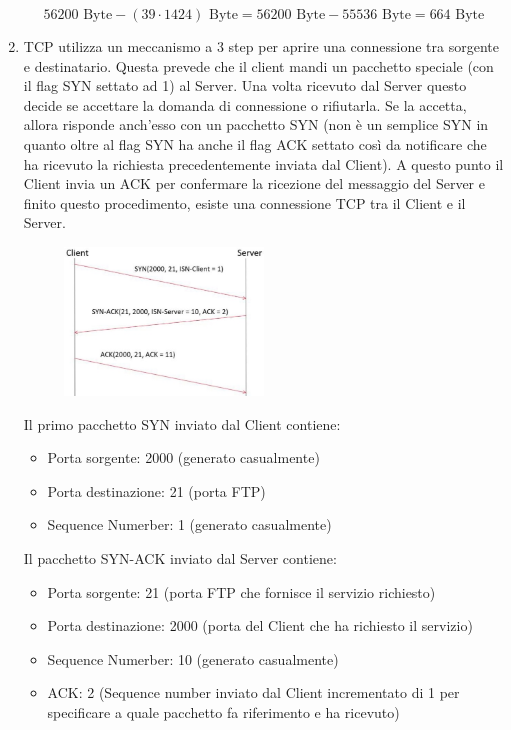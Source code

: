 \documentclass[10pt,a4paper]{article}
\begin{document}
\begin{enumerate}
		$$56200 \textrm{ Byte} - (39 \cdot 1424) \textrm{ Byte} = 56200 \textrm{ Byte} - 55536 \textrm{ Byte} = 664 \textrm{ Byte}$$
		\item TCP utilizza un meccanismo a 3 step per aprire una connessione tra sorgente e destinatario. Questa prevede che il client mandi un pacchetto speciale (con il flag SYN settato ad 1) al Server. Una volta ricevuto dal Server questo decide se accettare la domanda di connessione o rifiutarla. 
		Se la accetta, allora risponde anch'esso con un pacchetto SYN (non è un semplice SYN in quanto oltre al flag SYN ha anche il flag ACK settato così da notificare che ha ricevuto la richiesta precedentemente inviata dal Client). A questo punto il Client invia un ACK per confermare la ricezione 
		del messaggio del Server e finito questo procedimento, esiste una connessione TCP tra il Client e il Server.
		\begin{figure}[H]
			\centering
			\includegraphics[width=0.5\textwidth]{ConnectionSetup_12062019}
		\end{figure}
		Il primo pacchetto SYN inviato dal Client contiene:
		\begin{itemize}
			\item Porta sorgente: 2000 (generato casualmente)
			\item Porta destinazione: 21 (porta FTP)
			\item Sequence Numerber: 1 (generato casualmente)
		\end{itemize}
		Il pacchetto SYN-ACK inviato dal Server contiene:
		\begin{itemize}
			\item Porta sorgente: 21 (porta FTP che fornisce il servizio richiesto)
			\item Porta destinazione: 2000 (porta del Client che ha richiesto il servizio)
			\item Sequence Numerber: 10 (generato casualmente)
			\item ACK: 2 (Sequence number inviato dal Client incrementato di 1 per specificare a quale pacchetto fa riferimento e ha ricevuto)

\end{itemize}
\end{enumerate}
\end{document}
